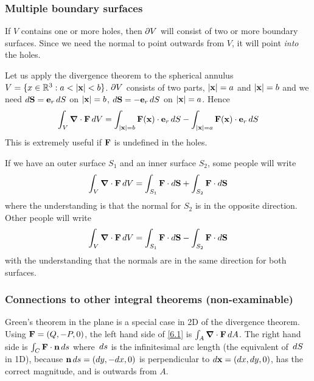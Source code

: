 \documentclass{../template/note}
\begin{document}
    \subsubsection{Multiple boundary surfaces}

    If \(V\) contains one or more holes, then \(\partial V\) will consist of two or more boundary surfaces. Since we need the normal to point outwards from \(V\), it will point \emph{into} the holes.

    \begin{example*}
        Let us apply the divergence theorem to the spherical annulus \(V = \{x \in \RR^3: a < |\V x| < b\}\). \(\partial V\) consists of two parts, \(|\V x| = a\) and \(|\V x| = b\) and we need \(d\V S = \V e_r \D S\) on \(|\V x| = b\), \(d\V S = -\V e_r \D S\) on \(|\V x| = a\). Hence
        \begin{align*}
            \int_V \div \V F \D V = \int_{|\V x| = b} \V F(\V x) \cdot \V e_r \D S - \int_{|\V x| = a} \V F(\V x) \cdot \V e_r \D S
        \end{align*}
        This is extremely useful if \(\V F\) is undefined in the holes.
    \end{example*}
    
    \begin{remark*}
        If we have an outer surface \(S_1\) and an inner surface \(S_2\), some people will write
        \begin{align*}
            \int_V \div \V F \D V = \int_{S_1} \V F \cdot d\V S + \int_{S_2} \V F \cdot d\V S
        \end{align*}
        where the understanding is that the normal for \(S_2\) is in the opposite direction. Other people will write
        \begin{align*}
            \int_V \div \V F \D V = \int_{S_1} \V F \cdot d\V S - \int_{S_2} \V F \cdot d\V S
        \end{align*}
        with the understanding that the normals are in the same direction for both surfaces.       
    \end{remark*}
    
    \subsubsection{Connections to other integral theorems (non-examinable)}
    
    Green's theorem in the plane is a special case in 2D of the divergence theorem. Using \(\V F = (Q, -P, 0)\), the left hand side of \cref{6.1} is \(\int_A \div \V F \D A\). The right hand side is \(\int_C \V F \cdot \V n \D s\) where \(\,d{s}\) is the infinitesimal arc length (the equivalent of \(\,d{S}\) in 1D), because \(\V n \D s = (dy, -dx, 0)\) is perpendicular to \(d \V x = (dx, dy, 0)\), has the correct magnitude, and is outwards from \(A\).
\end{document}
